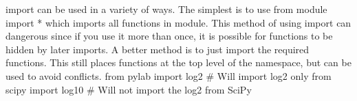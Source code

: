 import can be used in a variety of ways. The simplest is to use from module import * which imports
all functions in module. This method of using import can dangerous since if you use it more than once,
it is possible for functions to be hidden by later imports. A better method is to just import the required
functions. This still places functions at the top level of the namespace, but can be used to avoid conflicts.
from pylab import log2 # Will import log2 only
from scipy import log10 # Will not import the log2 from SciPy
